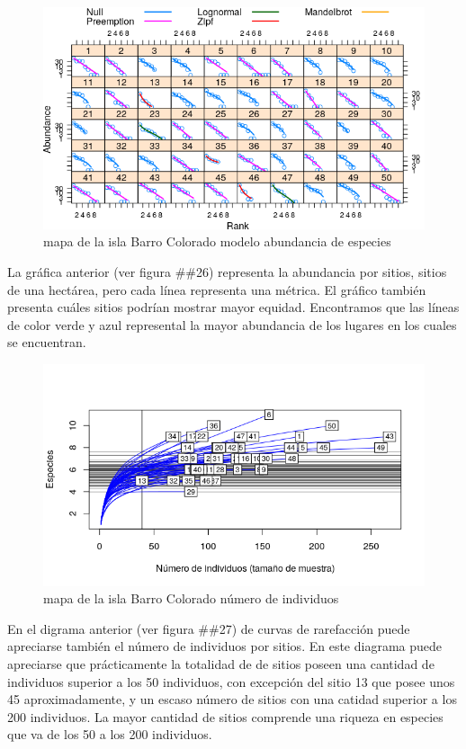 \documentclass[11pt,]{article}
\begin{document}
\begin{figure}
\centering
\includegraphics[width=1.00000\textwidth]{modelo_abundancia_especie.png}
\caption{mapa de la isla Barro Colorado modelo abundancia de especies
\label{fig:bci_map}}
\end{figure}

La gráfica anterior (ver figura \#\#26) representa la abundancia por
sitios, sitios de una hectárea, pero cada línea representa una métrica.
El gráfico también presenta cuáles sitios podrían mostrar mayor equidad.
Encontramos que las líneas de color verde y azul represental la mayor
abundancia de los lugares en los cuales se encuentran.

\begin{figure}
\centering
\includegraphics[width=1.00000\textwidth]{Numero_individuos.png}
\caption{mapa de la isla Barro Colorado número de individuos
\label{fig:bci_map}}
\end{figure}

En el digrama anterior (ver figura \#\#27) de curvas de rarefacción
puede apreciarse también el número de individuos por sitios. En este
diagrama puede apreciarse que prácticamente la totalidad de de sitios
poseen una cantidad de individuos superior a los 50 individuos, con
excepción del sitio 13 que posee unos 45 aproximadamente, y un escaso
número de sitios con una catidad superior a los 200 individuos. La mayor
cantidad de sitios comprende una riqueza en especies que va de los 50 a
los 200 individuos.
\end{document}
